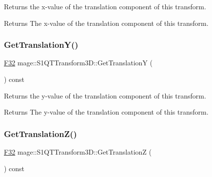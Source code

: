Returns the x-\/value of the translation component of this transform.

\begin{DoxyReturn}{Returns}
The x-\/value of the translation component of this transform. 
\end{DoxyReturn}
\mbox{\label{classmage_1_1_s1_q_t_transform3_d_ae6ba8a09f35b13a6d7f056a099f4f866}} 
\subsubsection{\texorpdfstring{Get\+Translation\+Y()}{GetTranslationY()}}
{\footnotesize\ttfamily \mbox{\hyperlink{namespacemage_aa97e833b45f06d60a0a9c4fc22ae02c0}{F32}} mage\+::\+S1\+Q\+T\+Transform3\+D\+::\+Get\+TranslationY (\begin{DoxyParamCaption}{ }\end{DoxyParamCaption}) const\hspace{0.3cm}{\ttfamily [noexcept]}}

Returns the y-\/value of the translation component of this transform.

\begin{DoxyReturn}{Returns}
The y-\/value of the translation component of this transform. 
\end{DoxyReturn}
\mbox{\label{classmage_1_1_s1_q_t_transform3_d_a74946246c6228f0eb3734129daeef712}} 
\subsubsection{\texorpdfstring{Get\+Translation\+Z()}{GetTranslationZ()}}
{\footnotesize\ttfamily \mbox{\hyperlink{namespacemage_aa97e833b45f06d60a0a9c4fc22ae02c0}{F32}} mage\+::\+S1\+Q\+T\+Transform3\+D\+::\+Get\+TranslationZ (\begin{DoxyParamCaption}{ }\end{DoxyParamCaption}) const\hspace{0.3cm}{\ttfamily [noexcept]}}


